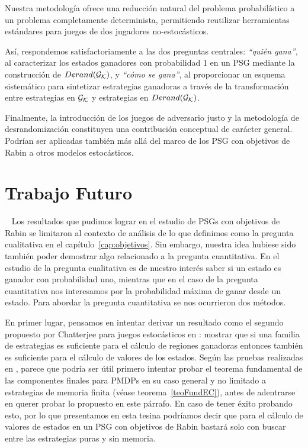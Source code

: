 Nuestra metodología ofrece una reducción natural del problema probabilístico a
un problema completamente determinista, permitiendo reutilizar herramientas
estándares para juegos de dos jugadores no-estocásticos.

Así, respondemos satisfactoriamente a las dos preguntas centrales:
\textit{“quién gana”}, al caracterizar los estados ganadores con probabilidad 1
en un PSG mediante la construcción de $Derand(\mathcal{G}_{\mathcal{K}})$, y \textit{“cómo se gana”}, al
proporcionar un esquema sistemático para sintetizar estrategias ganadoras a
través de la transformación entre estrategias en $\mathcal{G}_{\mathcal{K}}$ y estrategias en $Derand(\mathcal{G}_{\mathcal{K}})$.

Finalmente, la introducción de los juegos de adversario justo y la metodología
de desrandomización constituyen una contribución conceptual de carácter
general. Podrían ser aplicadas también más allá del marco de los PSG con
objetivos de Rabin a otros modelos estocásticos.


\section{Trabajo Futuro}
~\label{cap:conclusions:sec:future}
Los resultados que pudimos lograr en el estudio de PSGs con objetivos de Rabin
se limitaron al contexto de análisis de lo que definimos como la pregunta
cualitativa en el capítulo~\ref{cap:objetivos}. Sin embargo, nuestra idea
hubiese sido también poder demostrar algo relacionado a la pregunta
cuantitativa. En el estudio de la pregunta cualitativa es de nuestro interés
saber si un estado es ganador con probabilidad uno, mientras que en el caso de
la pregunta cuantitativa nos interesamos por la probabilidad máxima de ganar
desde un estado. Para abordar la pregunta cuantitativa se nos ocurrieron dos
métodos.

En primer lugar, pensamos en intentar derivar un resultado como el segundo
propuesto por Chatterjee para juegos estocásticos en \cite{ComplexityRabin}:
mostrar que si una familia de estrategias es suficiente para el cálculo de
regiones ganadoras entonces también es suficiente para el cálculo de valores de
los estados. Según las pruebas realizadas en \cite{ComplexityRabin}, parece que
podría ser útil primero intentar probar el teorema fundamental de las
componentes finales para PMDPs en su caso general y no limitado a estrategias
de memoria finita (véase teorema~\ref{teoFundEC}), antes de adentrarse en
querer probar lo propuesto en este párrafo. En caso de tener éxito probando
esto, por lo que presentamos en esta tesina podríamos decir que para el cálculo
de valores de estados en un PSG con objetivos de Rabin bastará solo con buscar
entre las estrategias puras y sin memoria.

